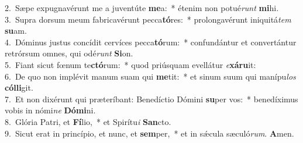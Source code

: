 {2.~}Sæpe expugnavérunt me a juventúte \textbf{me}a:~* étenim non potué\textit{runt} \textbf{mi}hi.\\
{3.~}Supra dorsum meum fabricavérunt pecca\textbf{tó}res:~* prolongavérunt iniquitá\textit{tem} \textbf{su}am.\\
{4.~}Dóminus justus concídit cervíces pecca\textbf{tó}rum:~* confundántur et convertántur retrórsum omnes, qui odé\textit{runt} \textbf{Si}on.\\
{5.~}Fiant sicut fœnum te\textbf{ctó}rum:~* quod priúsquam evellátur \textit{e}\textbf{xá}\textbf{ru}it:\\
{6.~}De quo non implévit manum suam qui \textbf{me}tit:~* et sinum suum qui manípu\textit{los} \textbf{cól}\textbf{li}git.\\
{7.~}Et non dixérunt qui præteríbant: Benedíctio Dómini \textbf{su}per vos:~* benedíximus vobis in nómi\textit{ne} \textbf{Dó}\textbf{mi}ni.\\
{8.~}Glória Patri, et \textbf{Fí}lio,~* et Spirítu\textit{i} \textbf{San}cto.\\
{9.~}Sicut erat in princípio, et nunc, et \textbf{sem}per,~* et in sǽcula sæculó\textit{rum}. \textbf{A}men.\\
